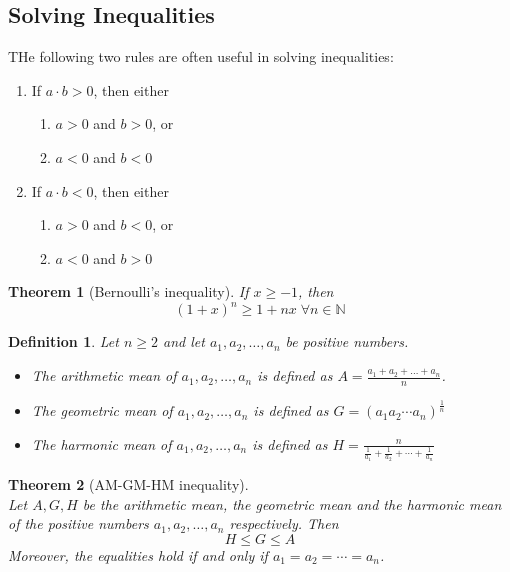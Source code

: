 \documentclass[8pt]{article}
\newtheorem{definition}{Definition}[section]
\newtheorem{theorem}{Theorem}[section]
\theoremstyle{definition}
\begin{document}
\subsection{Solving Inequalities}
THe following two rules are often useful in solving inequalities:
\begin{enumerate}[label=Rule \arabic*]
\item If $a\cdot b>0$, then either
\begin{enumerate}[label=(\roman*)]
\item $a>0$ and $b>0$, or
\item $a<0$ and $b<0$
\end{enumerate}
\item If $a\cdot b<0$, then either
\begin{enumerate}[label=(\roman*)]
\item $a>0$ and $b<0$, or
\item $a<0$ and $b>0$
\end{enumerate}
\end{enumerate}
\begin{theorem}[Bernoulli's inequality]\normalfont If $x\geq -1$, then
\[
(1+x)^n\geq 1+nx\;\forall n\in\mathbb{N}
\]
\end{theorem}
\begin{definition}\normalfont Let $n\geq 2$ and let $a_1,a_2,\ldots,a_n$ be positive numbers.
\begin{itemize}
\item The \textit{arithmetic mean} of $a_1,a_2,\ldots,a_n$ is defined as $A = \frac{ a_1+a_2+\ldots+a_n }{n}$.
\item The \textit{geometric mean} of $a_1,a_2,\ldots,a_n$ is defined as $G = (a_1a_2\cdots a_n)^{\frac{1}{n}}$
\item The \textit{harmonic mean} of  $a_1,a_2,\ldots,a_n$ is defined as $H = \frac{n}{\frac{1}{a_1}+\frac{1}{a_2}+\cdots+\frac{1}{a_n}}$
\end{itemize}
\end{definition}
\begin{theorem}[AM-GM-HM inequality]\hfill\\
\normalfont Let $A,G,H$ be the arithmetic mean, the geometric mean and the harmonic mean of the positive numbers $a_1,a_2,\ldots,a_n$ respectively. Then
\[
H\leq G\leq A
\]
Moreover, the equalities hold if and only if $a_1 = a_2 = \cdots = a_n$.
\end{theorem}
\end{document}
